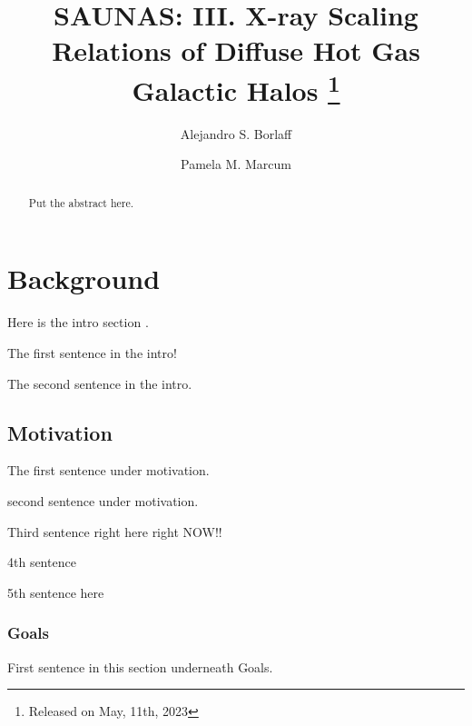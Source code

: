 \documentclass[modern]{aastex631}
\begin{document}
\title{\textbf{SAUNAS}: III. X-ray Scaling Relations of Diffuse Hot Gas Galactic Halos \footnote{Released on May, 11th, 2023}}
\author{Alejandro S. Borlaff}
\author{Pamela M. Marcum}

\begin{abstract}
Put the abstract here. 
\end{abstract}

\section{Background}
Here is the intro section \citep{aguerri+1998aj116_2136, bell+2006apj640_241,bell+2006apj652_270}. 

The first sentence in the intro! 

The second sentence in the intro. 

\subsection{Motivation}

The first sentence under motivation.

second sentence under motivation.

Third sentence right here right NOW!! 

4th sentence 

5th sentence here 

\subsubsection{Goals}
First sentence in this section underneath Goals. 

\begin{acknowledgements}

\end{acknowledgements}
\vspace{5mm}


% 
 

\end{document}
